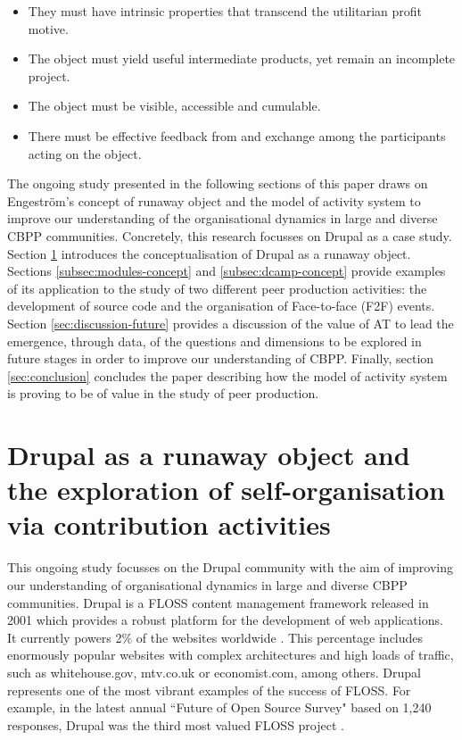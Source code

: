 \documentclass[a4paper, 12pt]{article}
\begin{document}
\begin{itemize}
	\item They must have intrinsic properties that transcend the utilitarian profit motive.
	\item The object must yield useful intermediate products, yet remain an incomplete project.
	\item The object must be visible, accessible and cumulable.
	\item There must be effective feedback from and exchange among the participants acting on the object.
\end{itemize}

The ongoing study presented in the following sections of this paper draws on Engeström's concept of runaway object and the model of activity system to improve our understanding of the organisational dynamics in large and diverse CBPP communities. Concretely, this research focusses on Drupal as a case study. Section \ref{sec:drupal} introduces the conceptualisation of Drupal as a runaway object. Sections \ref{subsec:modules-concept} and \ref{subsec:dcamp-concept} provide examples of its application to the study of two different peer production activities: the development of source code  and the organisation of Face-to-face (F2F) events. Section \ref{sec:discussion-future} provides a discussion of the value of AT to lead the emergence, through data, of the questions and dimensions to be explored in future stages in order to improve our understanding of CBPP. Finally, section \ref{sec:conclusion} concludes the paper describing how the model of activity system is proving to be of value in the study of peer production.


\section{Drupal as a runaway object and the exploration of self-organisation via contribution activities}
\label{sec:drupal}

This ongoing study focusses on the Drupal community with the aim of improving our understanding of organisational dynamics in large and diverse CBPP communities. Drupal is a FLOSS content management framework released in 2001 \parencite{drupal-history:2013:Online} which provides a robust platform for the development of web applications. It currently powers 2\% of the websites worldwide \parencite{cms-usage:2013:Online}. 
This percentage includes enormously popular websites with complex architectures and high loads of traffic, such as whitehouse.gov, mtv.co.uk or economist.com, among others. Drupal represents one of the most vibrant examples of the success of FLOSS. For example, in the latest annual ``Future of Open Source Survey" based on 1,240 responses, Drupal was the third most valued FLOSS project \parencite{future-open-source-survey:2015}.
\end{document}
